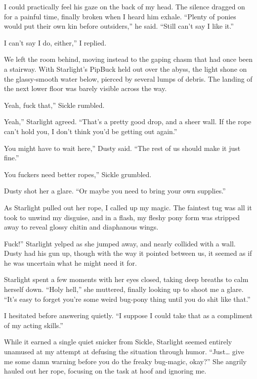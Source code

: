 I could practically feel his gaze on the back of my head. The silence dragged on for a painful time, finally broken when I heard him exhale. “Plenty of ponies would put their own kin before outsiders,” he said. “Still can’t say I like it.”

\leavevmode{}I can’t say I do, either,” I replied.

We left the room behind, moving instead to the gaping chasm that had once been a stairway. With Starlight’s PipBuck held out over the abyss, the light shone on the glassy-smooth water below, pierced by several lumps of debris. The landing of the next lower floor was barely visible across the way.

\leavevmode{}Yeah, fuck that,” Sickle rumbled.

\leavevmode{}Yeah,” Starlight agreed. “That’s a pretty good drop, and a sheer wall. If the rope can’t hold you, I don’t think you’d be getting out again.”

\leavevmode{}You might have to wait here,” Dusty said. “The rest of us should make it just fine.”

\leavevmode{}You fuckers need better ropes,” Sickle grumbled.

Dusty shot her a glare. “Or maybe you need to bring your own supplies.”

As Starlight pulled out her rope, I called up my magic. The faintest tug was all it took to unwind my disguise, and in a flash, my fleshy pony form was stripped away to reveal glossy chitin and diaphanous wings.

\leavevmode{}Fuck!” Starlight yelped as she jumped away, and nearly collided with a wall. Dusty had his gun up, though with the way it pointed between us, it seemed as if he was uncertain what he might need it for.

Starlight spent a few moments with her eyes closed, taking deep breaths to calm herself down. “Holy hell,” she muttered, finally looking up to shoot me a glare. “It’s easy to forget you’re some weird bug-pony thing until you do shit like that.”

I hesitated before answering quietly. “I suppose I could take that as a compliment of my acting skills.”

While it earned a single quiet snicker from Sickle, Starlight seemed entirely unamused at my attempt at defusing the situation through humor. “Just… give me some damn warning before you do the freaky bug-magic, okay?” She angrily hauled out her rope, focusing on the task at hoof and ignoring me.

